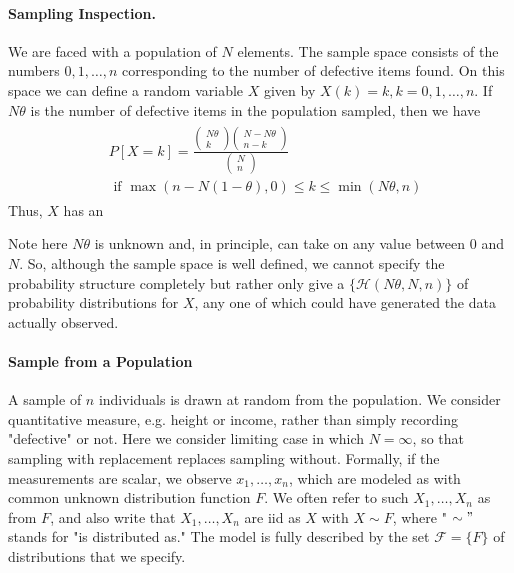 \documentclass{article}
\begin{document}
\paragraph{Sampling Inspection.}
\begin{exma}\label{ex:inspection}
We are faced with a population of $N$ elements. The sample space consists of the numbers $0,1, \ldots, n$ corresponding to the number of defective items found. On this space we can define a random variable $X$ given by $X(k)=k, k=0,1, \ldots, n$. If $N \theta$ is the number of defective items in the population sampled, then we have 
\begin{align*}
\begin{aligned}
&P[X=k]=\frac{\left(\begin{array}{c}
N \theta \\
k
\end{array}\right)\left(\begin{array}{c}
N-N \theta \\
n-k
\end{array}\right)}{\left(\begin{array}{c}
N \\
n
\end{array}\right)} \\
&\text { if } \max (n-N(1-\theta), 0) \leq k \leq \min (N \theta, n)
\end{aligned}
\end{align*}
Thus, $X$ has an 
\end{exma}
\begin{rema}
Note here $N \theta$ is unknown and, in principle, can take on any value between $0$ and $N$. So, although the sample space is well defined, we cannot specify the probability structure completely but rather only give a  $\{\mathcal{H}(N \theta, N, n)\}$ of probability distributions for $X$, any one of which could have generated the data actually observed.
\end{rema}

\paragraph{Sample from a Population}
\begin{exma}\label{ex:Population}
A sample of $n$ individuals is drawn at random from the population. We consider quantitative measure, e.g. height or income, rather than simply recording "defective" or not. 
 Here we consider limiting case in which $N=\infty$, so that sampling with replacement replaces sampling without. Formally, if the measurements are scalar, we observe $x_{1}, \ldots, x_{n}$, which are modeled as with common unknown distribution function $F .$ We often refer to such $X_{1}, \ldots, X_{n}$ as  from $F$, and also write that $X_{1}, \ldots, X_{n}$ are \gls{iid} as $X$ with $X \sim F$, where " $\sim "$ stands for "is distributed as." The model is fully described by the set $\mathcal{F}=\{F\}$ of distributions that we specify. 
 \end{exma}
\end{document}
